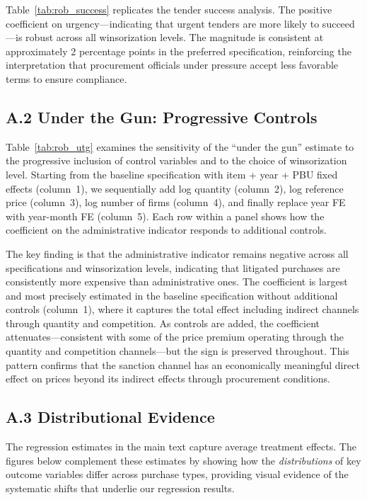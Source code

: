 Table~\ref{tab:rob_success} replicates the tender success analysis. The positive coefficient on urgency---indicating that urgent tenders are more likely to succeed---is robust across all winsorization levels. The magnitude is consistent at approximately 2 percentage points in the preferred specification, reinforcing the interpretation that procurement officials under pressure accept less favorable terms to ensure compliance.



\subsection*{A.2 Under the Gun: Progressive Controls}

Table~\ref{tab:rob_utg} examines the sensitivity of the ``under the gun'' estimate to the progressive inclusion of control variables and to the choice of winsorization level. Starting from the baseline specification with item + year + PBU fixed effects (column~1), we sequentially add log quantity (column~2), log reference price (column~3), log number of firms (column~4), and finally replace year FE with year-month FE (column~5). Each row within a panel shows how the coefficient on the administrative indicator responds to additional controls.

The key finding is that the administrative indicator remains negative across all specifications and winsorization levels, indicating that litigated purchases are consistently more expensive than administrative ones. The coefficient is largest and most precisely estimated in the baseline specification without additional controls (column~1), where it captures the total effect including indirect channels through quantity and competition. As controls are added, the coefficient attenuates---consistent with some of the price premium operating through the quantity and competition channels---but the sign is preserved throughout. This pattern confirms that the sanction channel has an economically meaningful direct effect on prices beyond its indirect effects through procurement conditions.



\subsection*{A.3 Distributional Evidence}

The regression estimates in the main text capture average treatment effects. The figures below complement these estimates by showing how the \textit{distributions} of key outcome variables differ across purchase types, providing visual evidence of the systematic shifts that underlie our regression results.

